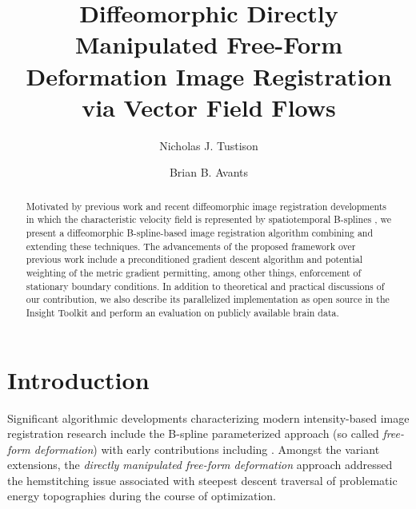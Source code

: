 \documentclass{llncs}
\begin{document}
%
\frontmatter          %
%

\mainmatter              %
%
\title{Diffeomorphic Directly Manipulated Free-Form Deformation Image Registration via Vector Field Flows}
%
%
\author{Nicholas J. Tustison \and Brian B. Avants}


\maketitle              %

\begin{abstract}
Motivated by previous work \cite{tustison2009} and 
recent diffeomorphic image registration developments in which the 
characteristic velocity field is represented by spatiotemporal B-splines 
\cite{de-craene2011}, we present a diffeomorphic B-spline-based
image registration algorithm combining and extending these techniques.  
The advancements of the proposed framework
over previous work include a preconditioned gradient descent algorithm and 
potential weighting 
of the metric gradient permitting, among other things, enforcement of 
stationary boundary conditions.  In addition to
theoretical and practical discussions of our contribution, we also describe 
its parallelized implementation as open source in the Insight Toolkit and
perform an evaluation on publicly available brain data.
\end{abstract}

\section{Introduction}
Significant algorithmic developments characterizing modern intensity-based
image registration research include the B-spline parameterized approach
(so called {\em free-form deformation}) with early contributions 
including \cite{szeliski1997,thevenaz1998,rueckert1999}.  Amongst the 
variant extensions, the 
{\em directly manipulated free-form deformation} approach  \cite{tustison2009} 
 addressed the hemstitching issue associated with steepest descent traversal of
problematic energy topographies during the course of optimization.
\end{document}
